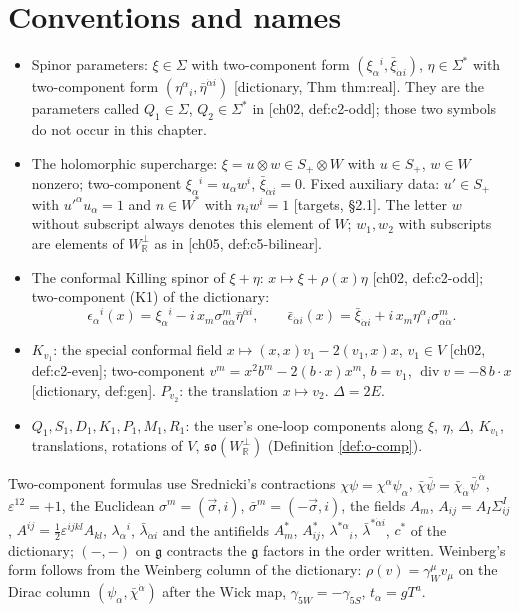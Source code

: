 \section{Conventions and names}

\begin{definition}
\label{def:o-names}
\begin{itemize}
\item Spinor parameters: $\xi\in\Sigma$ with two-component form $(\xi_\alpha{}^i,\bar\xi_{\dot\alpha i})$, $\eta\in\Sigma^*$ with two-component form $(\eta^\alpha{}_i,\bar\eta^{\dot\alpha i})$ [dictionary, Thm thm:real]. They are the parameters called $Q_1\in\Sigma$, $Q_2\in\Sigma^*$ in [ch02, def:c2-odd]; those two symbols do not occur in this chapter.
\item The holomorphic supercharge: $\xi=u\otimes w\in S_+\otimes W$ with $u\in S_+$, $w\in W$ nonzero; two-component $\xi_\alpha{}^i=u_\alpha w^i$, $\bar\xi_{\dot\alpha i}=0$. Fixed auxiliary data: $u'\in S_+$ with $u'^\alpha u_\alpha=1$ and $n\in W^*$ with $n_iw^i=1$ [targets, §2.1]. The letter $w$ without subscript always denotes this element of $W$; $w_1,w_2$ with subscripts are elements of $W_{\mathbb R}^\perp$ as in [ch05, def:c5-bilinear].
\item The conformal Killing spinor of $\xi+\eta$: $x\mapsto\xi+\rho(x)\eta$ [ch02, def:c2-odd]; two-component (K1) of the dictionary:
\[
\epsilon_\alpha{}^i(x)=\xi_\alpha{}^i-i\,x_m\sigma^m_{\alpha\dot\alpha}\bar\eta^{\dot\alpha i},\qquad \bar\epsilon_{\dot\alpha i}(x)=\bar\xi_{\dot\alpha i}+i\,x_m\eta^\alpha{}_i\sigma^m_{\alpha\dot\alpha}.
\]
\item $K_{v_1}$: the special conformal field $x\mapsto(x,x)v_1-2(v_1,x)x$, $v_1\in V$ [ch02, def:c2-even]; two-component $v^m=x^2b^m-2(b\cdot x)x^m$, $b=v_1$, $\operatorname{div}v=-8\,b\cdot x$ [dictionary, def:gen]. $P_{v_2}$: the translation $x\mapsto v_2$. $\Delta=2E$.
\item $Q_1,S_1,D_1,K_1,P_1,M_1,R_1$: the user's one-loop components along $\xi$, $\eta$, $\Delta$, $K_{v_1}$, translations, rotations of $V$, $\mathfrak{so}(W_{\mathbb R}^\perp)$ (Definition \ref{def:o-comp}).
\end{itemize}
Two-component formulas use Srednicki's contractions $\chi\psi=\chi^\alpha\psi_\alpha$, $\bar\chi\bar\psi=\bar\chi_{\dot\alpha}\bar\psi^{\dot\alpha}$, $\varepsilon^{12}=+1$, the Euclidean $\sigma^m=(\vec\sigma,i)$, $\bar\sigma^m=(-\vec\sigma,i)$, the fields $A_m$, $A_{ij}=A_I\Sigma^I_{ij}$, $A^{ij}=\tfrac12\varepsilon^{ijkl}A_{kl}$, $\lambda_\alpha{}^i$, $\bar\lambda_{\dot\alpha i}$ and the antifields $A^*_m$, $A^*_{ij}$, $\lambda^{*\alpha}{}_i$, $\bar\lambda^{*\dot\alpha i}$, $c^*$ of the dictionary; $(-,-)$ on $\mathfrak g$ contracts the $\mathfrak g$ factors in the order written. Weinberg's form follows from the Weinberg column of the dictionary: $\rho(v)=\gamma_W^\mu v_\mu$ on the Dirac column $(\psi_\alpha,\bar\chi^{\dot\alpha})$ after the Wick map, $\gamma_{5W}=-\gamma_{5S}$, $t_\alpha=gT^a$.
\end{definition}

